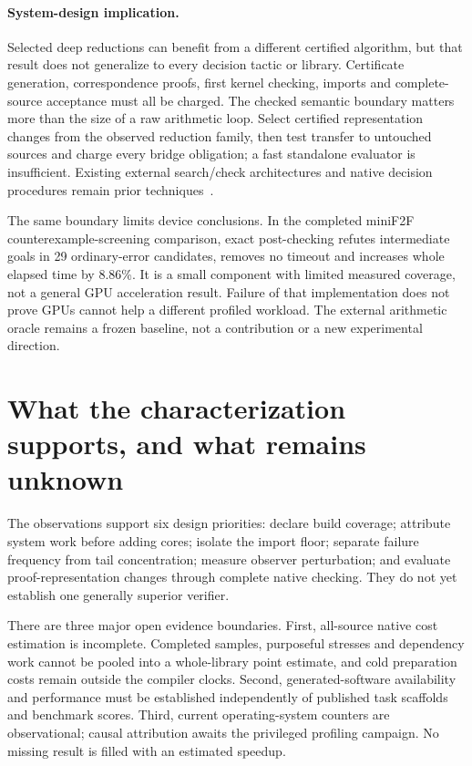 \documentclass[10pt,twocolumn]{article}
\begin{document}
\paragraph{System-design implication.}
Selected deep reductions can benefit from a different certified algorithm,
but that result does not generalize to every decision tactic or library.
Certificate generation, correspondence proofs, first kernel checking,
imports and complete-source acceptance must all be charged.
The checked semantic boundary matters more than the size of a raw arithmetic
loop. Select certified representation changes from the observed reduction
family, then test transfer to untouched sources and charge every bridge
obligation; a fast standalone evaluator is insufficient.
Existing external search/check architectures and native decision
procedures remain prior techniques~\cite{mathlib,lean49DecideSource}.

The same boundary limits device conclusions.
In the completed miniF2F counterexample-screening comparison, exact
post-checking refutes intermediate goals in 29 ordinary-error candidates,
removes no timeout and increases whole elapsed time by 8.86\%.
It is a small component with limited measured coverage, not a general GPU
acceleration result. Failure of that implementation does not prove GPUs
cannot help a different profiled workload.
The external arithmetic oracle remains a frozen baseline, not a contribution
or a new experimental direction.

\section{What the characterization supports, and what remains unknown}
\label{sec:limits}
The observations support six design priorities: declare build coverage;
attribute system work before adding cores; isolate the import floor;
separate failure frequency from tail concentration; measure observer
perturbation; and evaluate proof-representation changes through complete
native checking. They do not yet establish one generally superior verifier.

There are three major open evidence boundaries.
First, all-source native cost estimation is incomplete. Completed samples,
purposeful stresses and dependency work cannot be pooled into a whole-library
point estimate, and cold preparation costs remain outside the compiler
clocks. Second, generated-software availability and performance must be
established independently of published task scaffolds and benchmark scores.
Third, current operating-system counters are observational; causal attribution
awaits the privileged profiling campaign. No missing result is filled with
an estimated speedup.
\end{document}
